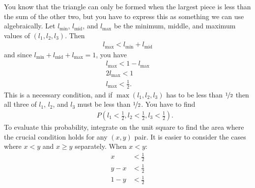 \documentclass[a4paper]{article}
\begin{document}
\begin{center}
\end{center}
You know that the triangle can only be formed when the largest piece is less than the sum of the other two, but you have to express this as something we can use algebraically.
Let
$l_\text{min}$,
$l_\text{mid}$, and
$l_\text{max}$
be the minimum, middle, and maximum values of
$(l_1, l_2, l_3)$.
Then
\begin{align*}
  l_\text{max} < l_\text{min} + l_\text{mid}
\end{align*}
and since
$  l_\text{min} + l_\text{mid} + l_\text{max}  = 1 $,
you have
\begin{align*}
  l_\text{max} < 1 - l_\text{max}  \\
2 l_\text{max} < 1 \\
 l_\text{max} < \frac{1}{2}
 \text{.}
\end{align*}
This is a necessary condition, and if
$\max(l_1, l_2, l_3)$
has to be less than
$\nicefrac{1}{2}$
then all three of
$l_1$, $l_2$, and $l_3$
must be less than $\nicefrac{1}{2}$.
You have to find
\begin{align*}
&\phantom{=}
P\left(
l_1 < \frac{1}{2} ,
l_2 < \frac{1}{2} ,
l_3 < \frac{1}{2}
\right)
\text{.}
\end{align*}
To evaluate this probability, integrate on the unit square to find the area where the crucial condition holds for any $(x,y)$ pair.
It is easier to consider the cases where $x<y$ and $x \geq y$ separately.
When $x<y$:
\begin{align*}
x     &< \frac{1}{2} \\
   y - x   &< \frac{1}{2} \\
1 -   y    &< \frac{1}{2}
\end{align*}
\end{document}
